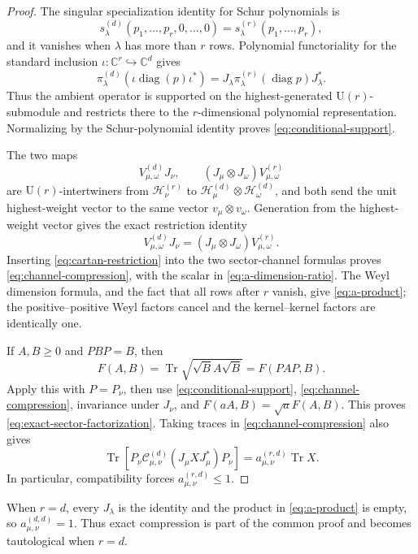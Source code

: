 \documentclass[11pt]{article}
\theoremstyle{remark}
\theoremstyle{plain}
\newcommand{\C}{\mathbb C}
\newcommand{\cC}{\mathcal C}
\newcommand{\cH}{\mathcal H}
\newcommand{\U}{\mathrm U}
\newcommand{\diag}{\operatorname{diag}}
\newcommand{\Tr}{\operatorname{Tr}}
\newcommand{\ot}{\otimes}
\begin{document}
\begin{proof}
The singular specialization identity for Schur polynomials is
\[
  s_\lambda^{(d)}(p_1,\ldots,p_r,0,\ldots,0)
  =s_\lambda^{(r)}(p_1,\ldots,p_r),
\]
and it vanishes when \(\lambda\) has more than \(r\) rows.  Polynomial
functoriality for the standard inclusion
\(\iota:\C^r\hookrightarrow\C^d\) gives
\[
  \pi_\lambda^{(d)}
    \!\left(\iota\diag(p)\iota^*\right)
  =J_\lambda\pi_\lambda^{(r)}(\diag p)J_\lambda^*.
\]
Thus the ambient operator is supported on the highest-generated
\(\U(r)\)-submodule and restricts there to the \(r\)-dimensional polynomial
representation.  Normalizing by the Schur-polynomial identity proves
\eqref{eq:conditional-support}.

The two maps
\[
  V_{\mu,\omega}^{(d)}J_\nu,
  \qquad
  (J_\mu\ot J_\omega)V_{\mu,\omega}^{(r)}
\]
are \(\U(r)\)-intertwiners from \(\cH_\nu^{(r)}\) to
\(\cH_\mu^{(d)}\ot\cH_\omega^{(d)}\), and both send the unit
highest-weight vector to the same vector
\(v_\mu\ot v_\omega\).  Generation from the highest-weight vector gives
the exact restriction identity
\begin{equation}
  V_{\mu,\omega}^{(d)}J_\nu
  =(J_\mu\ot J_\omega)V_{\mu,\omega}^{(r)}.
  \label{eq:cartan-restriction}
\end{equation}
Inserting \eqref{eq:cartan-restriction} into the two sector-channel
formulas proves \eqref{eq:channel-compression}, with the scalar in
\eqref{eq:a-dimension-ratio}.  The Weyl dimension formula, and the fact
that all rows after \(r\) vanish, give \eqref{eq:a-product}; the
positive--positive Weyl factors cancel and the kernel--kernel factors are
identically one.

If \(A,B\ge0\) and \(PBP=B\), then
\[
  F(A,B)=\Tr\sqrt{\sqrt B A\sqrt B}
        =F(PAP,B).
\]
Apply this with \(P=P_\nu\), then use
\eqref{eq:conditional-support}, \eqref{eq:channel-compression}, invariance
under \(J_\nu\), and \(F(aA,B)=\sqrt a F(A,B)\).  This proves
\eqref{eq:exact-sector-factorization}.
Taking traces in \eqref{eq:channel-compression} also gives
\[
  \Tr\!\left[
    P_\nu\cC_{\mu,\nu}^{(d)}(J_\mu XJ_\mu^*)P_\nu
  \right]
  =a_{\mu,\nu}^{(r,d)}\Tr X.
\]
In particular, compatibility forces \(a_{\mu,\nu}^{(r,d)}\le1\).
\end{proof}

When \(r=d\), every \(J_\lambda\) is the identity and the product in
\eqref{eq:a-product} is empty, so
\(a_{\mu,\nu}^{(d,d)}=1\).  Thus exact compression is part of the common
proof and becomes tautological when \(r=d\).
\end{document}

